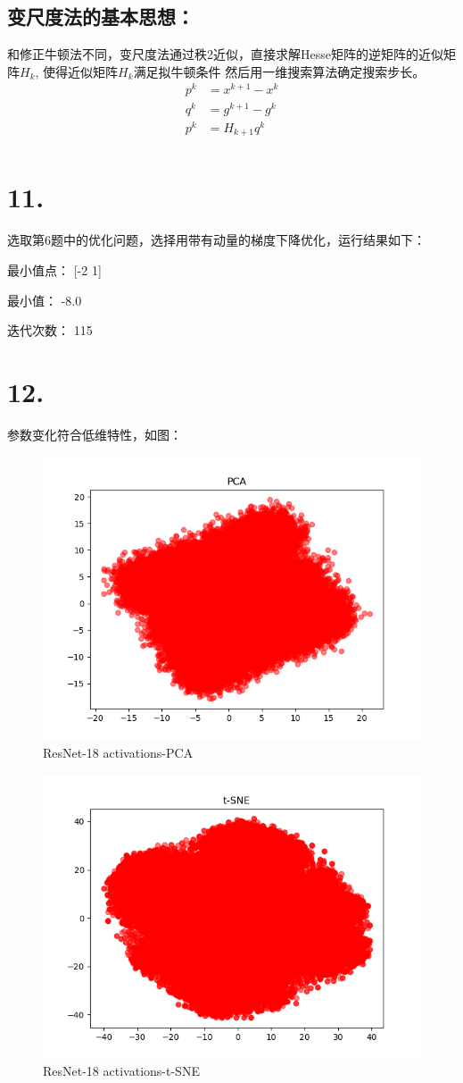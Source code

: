 \documentclass{article}
\begin{document}
    \subsection*{变尺度法的基本思想：}

    和修正牛顿法不同，变尺度法通过秩2近似，直接求解Hesse矩阵的逆矩阵的近似矩阵$H_k$, 使得近似矩阵$H_k$满足拟牛顿条件
    然后用一维搜索算法确定搜索步长。
    \begin{align*}
        p^k &= x^{k+1}- x^{k} \\
        q^k &= g^{k+1}- g^{k} \\
        p^k &= H_{k+1}q^k \\ 
    \end{align*}

	\section*{11.}

    
    选取第6题中的优化问题，选择用带有动量的梯度下降优化，运行结果如下：

    最小值点： [-2   1]
    
    最小值： -8.0
    
    迭代次数： 115

	\section*{12.}

    参数变化符合低维特性，如图：

    \begin{figure}[h!]
        \centering
        \includegraphics[width=0.5\linewidth]{./figs/PCA.png}
        \caption{ResNet-18 activations-PCA}
        \label{fig:pca}
    \end{figure}

    \begin{figure}[h!]
        \centering
        \includegraphics[width=0.5\linewidth]{./figs/tsne.png}
        \caption{ResNet-18 activations-t-SNE}
        \label{fig:tsne}
    \end{figure}
\end{document}
